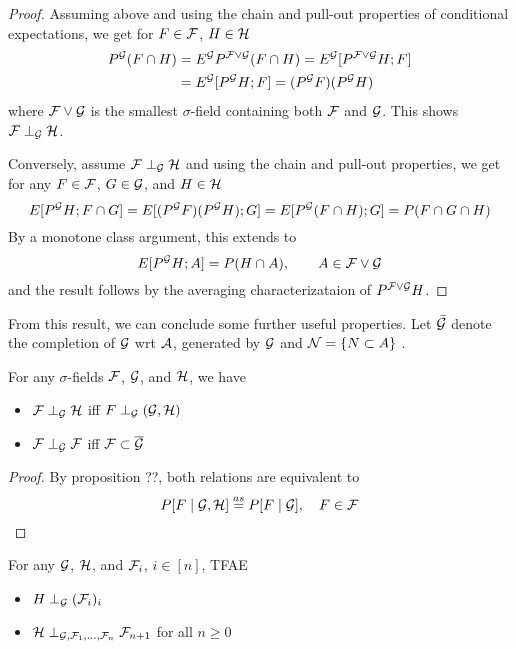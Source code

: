 \begin{proof}
  Assuming above and using the chain and pull-out properties of
  conditional expectations, we get for $F \in \mathcal{F}$, $H \in \mathcal{H}$
  \begin{align*}
    P^{\mathcal{G}}(F \cap H)
    &= E^{\mathcal{G}} P^{\mathcal{F} \lor \mathcal{G}}(F \cap H) = E^{\mathcal{G}}[ P^{\mathcal{F} \lor \mathcal{G}} H; F] \\
    &= E^{\mathcal{G}}[ P^{\mathcal{G}} H; F] = (P^{\mathcal{G}} F)(P^{\mathcal{G}} H)
  \end{align*}
  where $\mathcal{F} \lor \mathcal{G}$ is the smallest $\sigma$-field containing
  both $\mathcal{F}$ and $\mathcal{G}$. This shows $\mathcal{F} \perp_{\mathcal{G}} \mathcal{H}$.

  Conversely, assume $\mathcal{F} \perp_{\mathcal{G}} \mathcal{H}$ and using the chain and
  pull-out properties, we get for any $F \in \mathcal{F}$, $G \in \mathcal{G}$,
  and $H \in \mathcal{H}$
  \[
    E[P^{\mathcal{G}} H; F \cap G]
    = E[(P^{\mathcal{G}} F)(P^{\mathcal{G}} H); G]
    = E[P^{\mathcal{G}}(F \cap H); G]
    = P(F \cap G \cap H)
  \]
  By a monotone class argument, this extends to
  \[
    E[P^{\mathcal{G}} H; A] = P(H \cap A), \qquad A \in \mathcal{F} \lor \mathcal{G}
  \]
  and the result follows by the averaging characterizataion of
  $P^{\mathcal{F} \lor \mathcal{G}} H$.
\end{proof}

From this result, we can conclude some further useful properties.
Let $\bar{\mathcal{G}}$ denote the completion of $\mathcal{G}$ wrt
$\mathcal{A}$, generated by $\mathcal{G}$ and $\mathcal{N} = \{ N \subset A \}$ .

\begin{corollary}
  For any $\sigma$-fields $\mathcal{F}$, $\mathcal{G}$, and $\mathcal{H}$, we have
  \begin{itemize}
    \item $\mathcal{F} \perp_{\mathcal{G}} \mathcal{H}$ iff $F \perp_{\mathcal{G}} (\mathcal{G}, \mathcal{H})$
    \item $\mathcal{F} \perp_{\mathcal{G}} \mathcal{F}$ iff $\mathcal{F} \subset \overline{\mathcal{G}}$
  \end{itemize}
\end{corollary}

\begin{proof}
  By proposition ??, both relations are equivalent to
  \[
    P[F \mid \mathcal{G}, \mathcal{H}] \overset{as}{=} P[F \mid \mathcal{G}],\quad F \in \mathcal{F}
  \]
\end{proof}

\begin{proposition}
  For any $\mathcal{G}$, $\mathcal{H}$, and $\mathcal{F}_i$, $i \in [n]$, TFAE
  \begin{itemize}
    \item $H \perp_{\mathcal{G}} (\mathcal{F}_i)_{i}$
    \item $\mathcal{H} \perp_{\mathcal{G}, \mathcal{F}_1, \ldots, \mathcal{F}_n} \mathcal{F}_{n+1}$ for all $n \geq 0$
  \end{itemize}
\end{proposition}

